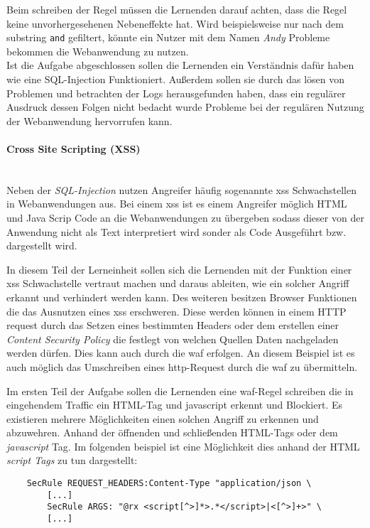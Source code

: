 Beim schreiben der Regel müssen die Lernenden darauf achten, dass die Regel keine unvorhergesehenen Nebeneffekte hat.
Wird beispielsweise nur nach dem substring \verb|and| gefiltert, könnte ein Nutzer mit dem Namen \textit{Andy} Probleme bekommen die Webanwendung zu nutzen.\\


Ist die Aufgabe abgeschlossen sollen die Lernenden ein Verständnis dafür haben wie eine SQL-Injection Funktioniert.
Außerdem sollen sie durch das lösen von Problemen und betrachten der Logs herausgefunden haben, dass ein regulärer Ausdruck dessen Folgen nicht bedacht wurde Probleme bei der regulären Nutzung der Webanwendung hervorrufen kann.

\paragraph{Cross Site Scripting (XSS)}\ \\

Neben der \textit{SQL-Injection} nutzen Angreifer häufig sogenannte \ac{xss} Schwachstellen in Webanwendungen aus.
Bei einem \ac{xss} ist es einem Angreifer möglich HTML und Java Scrip Code an die Webanwendungen zu übergeben sodass dieser von der Anwendung nicht als Text interpretiert wird sonder als Code Ausgeführt bzw. dargestellt wird.

In diesem Teil der Lerneinheit sollen sich die Lernenden mit der Funktion einer \ac{xss} Schwachstelle vertraut machen und daraus ableiten, wie ein solcher Angriff erkannt und verhindert werden kann.
Des weiteren besitzen Browser Funktionen die das Ausnutzen eines \ac{xss} erschweren.
Diese werden können in einem HTTP request durch das Setzen eines bestimmten Headers oder dem erstellen einer \textit{Content Security Policy} die festlegt von welchen Quellen Daten nachgeladen werden dürfen.
Dies kann auch durch die \ac{waf} erfolgen.
An diesem Beispiel ist es auch möglich das Umschreiben eines \ac{http}-Request durch die \ac{waf} zu übermitteln.

Im ersten Teil der Aufgabe sollen die Lernenden eine \ac{waf}-Regel schreiben die in eingehendem Traffic ein HTML-Tag und javascript erkennt und Blockiert.
Es existieren mehrere Möglichkeiten einen solchen Angriff zu erkennen und abzuwehren.
Anhand der öffnenden und schließenden HTML-Tags oder dem \textit{javascript} Tag.
Im folgenden beispiel ist eine Möglichkeit dies anhand der HTML \textit{script Tags} zu tun dargestellt:

\begin{verbatim}
    SecRule REQUEST_HEADERS:Content-Type "application/json \
        [...]
        SecRule ARGS: "@rx <script[^>]*>.*</script>|<[^>]+>" \
        [...]
\end{verbatim}

